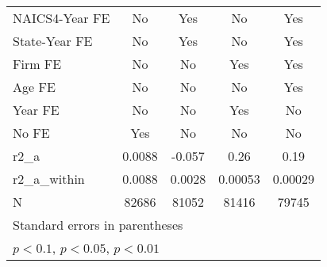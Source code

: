 {\begin{tabular}{l*{4}{c}}
\addlinespace
NAICS4-Year FE      &          No         &         Yes         &          No         &         Yes         \\
\addlinespace
State-Year FE       &          No         &         Yes         &          No         &         Yes         \\
\addlinespace
Firm FE             &          No         &          No         &         Yes         &         Yes         \\
\addlinespace
Age FE              &          No         &          No         &          No         &         Yes         \\
\addlinespace
Year FE             &          No         &          No         &         Yes         &          No         \\
\addlinespace
No FE               &         Yes         &          No         &          No         &          No         \\
\midrule
r2\_a                &      0.0088         &      -0.057         &        0.26         &        0.19         \\
r2\_a\_within         &      0.0088         &      0.0028         &     0.00053         &     0.00029         \\
N                   &       82686         &       81052         &       81416         &       79745         \\
\bottomrule
\multicolumn{5}{l}{\footnotesize Standard errors in parentheses}\\
\multicolumn{5}{l}{\footnotesize \sym{*} \(p<0.1\), \sym{**} \(p<0.05\), \sym{***} \(p<0.01\)}\\
\end{tabular}
}

